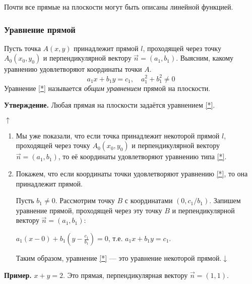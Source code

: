 \documentclass{article}
\begin{document}
    Почти все прямые на плоскости могут быть описаны линейной функцией.

    \subsubsection{Уравнение прямой}

    Пусть точка \(A(x,y)\) принадлежит прямой \(l\), проходящей через точку \(A_0(x_0, y_0)\) и перпендикулярной вектору \(\overset{\rightarrow}{n} = (a_1, b_1)\). Выясним, какому уравнению удовлетворяют координаты точки \(A\).
    \begin{equation}\label{*}
        a_1x + b_1y = c_1,\quad a_1^2 + b_1^2 \not = 0
    \end{equation}
    Уравнение \ref{*} называется \textit{общим уравнением} прямой на плоскости.

    \textbf{Утверждение.} Любая прямая на плоскости задаётся уравнением \ref{*}.

    \(\uparrow\)
    \begin{enumerate}
        \item Мы уже показали, что если точка принадлежит некоторой прямой \(l\), проходящей через точку \(A_0(x_0, y_0)\)
        и перпендикулярной вектору \(\overset{\rightarrow}{n} = (a_1, b_1)\), то её координаты удовлетворяют уравнению типа \ref{*}.
        \item Покажем, что если координаты точки удовлетворяют уравнению \ref{*}, то она принадлежит прямой.
        
        Пусть \(b_1 \not = 0\). Рассмотрим точку \(B\) с координатами \((0, c_1/b_1)\). Запишем уравнение прямой, проходящей через эту точку \(B\) и перпендикулярной вектору \(\overset{\rightarrow}{n} = (a_1, b_1)\):

        \(a_1(x-0) + b_1(y - \frac{c_1}{b_1}) = 0\), т.е. \(a_1x+b_1y=c_1\).

        Таким образом, уравнение \ref{*} --- это уравнение некоторой прямой.\quad \(\downarrow\)
    \end{enumerate}

    \textbf{Пример.} \(x+y=2\). Это прямая, перпендикулярная вектору \(\overset{\rightarrow}{n} = (1, 1)\).
\end{document}
